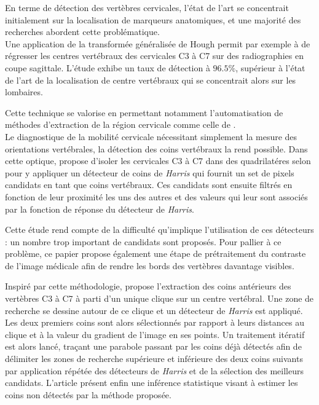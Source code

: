         En terme de détection des vertèbres cervicales, l'état de l'art se concentrait initialement sur la localisation de marqueurs anatomiques, et une majorité des recherches abordent cette problématique.
        \\

        Une application de la transformée généralisée de Hough permit par exemple à \cite{Lahrmam2012} de régresser les centres vertébraux des cervicales C3 à C7 sur des radiographies en coupe sagittale. L'étude exhibe un taux de détection à $96.5\%$, supérieur à l'état de l'art de la localisation de centre vertébraux qui se concentrait alors sur les lombaires.

        Cette technique se valorise en permettant notamment l'automatisation de méthodes d'extraction de la région cervicale comme celle de \cite{Benjelloun2006a}.
        \\

        Le diagnostique de la mobilité cervicale nécessitant simplement la mesure des orientations vertébrales, la détection des coins vertébraux la rend possible. Dans cette optique, \cite{Mahmoudi2007} propose d'isoler les cervicales C3 à C7 dans des quadrilatéres selon \cite{Benjelloun2006a} pour y appliquer un détecteur de coins de {\itshape Harris} qui fournit un set de pixels candidats en tant que coins vertébraux. Ces candidats sont ensuite filtrés en fonction de leur proximité les uns des autres et des valeurs qui leur sont associés par la fonction de réponse du détecteur de {\itshape Harris}.

        Cette étude rend compte de la difficulté qu'implique l'utilisation de ces détecteurs : un nombre trop important de candidats sont proposés. Pour pallier à ce problème, ce papier propose également une étape de prétraitement du contraste de l'image médicale afin de rendre les bords des vertèbres davantage visibles.

        Inspiré par cette méthodologie, \cite{Benjelloun2009} propose l'extraction des coins antérieurs des vertèbres C3 à C7 à parti d'un unique clique sur un centre vertébral. Une zone de recherche se dessine autour de ce clique et un détecteur de {\itshape Harris} est appliqué. Les deux premiers coins sont alors sélectionnés par rapport à leurs distances au clique et à la valeur du gradient de l'image en ses points. Un traitement itératif est alors lancé, traçant une parabole passant par les coins déjà détectés afin de délimiter les zones de recherche supérieure et inférieure des deux coins suivants par application répétée des détecteurs de {\itshape Harris} et de la sélection des meilleurs candidats. L'article présent enfin une inférence statistique visant à estimer les coins non détectés par la méthode proposée.


